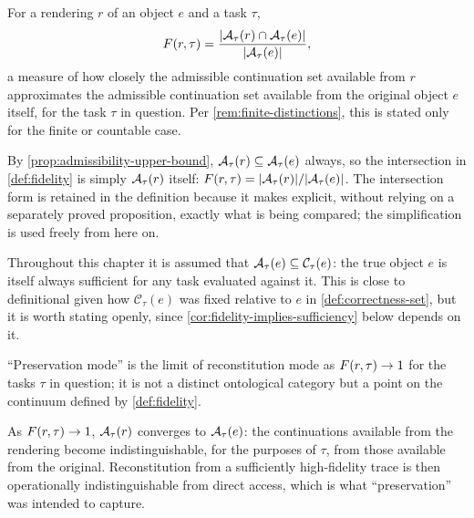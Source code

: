 \begin{definition}[Fidelity]
\label{def:fidelity}
For a rendering $r$ of an object $e$ and a task $\tau$,
\[
F(r,\tau) = \frac{\lvert \mathcal{A}_{\tau}(r) \cap \mathcal{A}_{\tau}(e)
\rvert}{\lvert \mathcal{A}_{\tau}(e) \rvert},
\]
a measure of how closely the admissible continuation set available from
$r$ approximates the admissible continuation set available from the
original object $e$ itself, for the task $\tau$ in question. Per
\cref{rem:finite-distinctions}, this is stated only for the finite or
countable case.
\end{definition}

\begin{remark}
\label{rem:fidelity-simplifies}
By \cref{prop:admissibility-upper-bound}, $\mathcal{A}_{\tau}(r) \subseteq
\mathcal{A}_{\tau}(e)$ always, so the intersection in \cref{def:fidelity} is
simply $\mathcal{A}_{\tau}(r)$ itself:
$F(r,\tau) = \lvert\mathcal{A}_{\tau}(r)\rvert / \lvert\mathcal{A}_{\tau}(e)\rvert$.
The intersection form is retained in the definition because it makes
explicit, without relying on a separately proved proposition, exactly
what is being compared; the simplification is used freely from here on.
\end{remark}

\begin{remark}
\label{rem:ground-truth-sufficiency}
Throughout this chapter it is assumed that $\mathcal{A}_{\tau}(e) \subseteq
\mathcal{C}_\tau(e)$: the true object $e$ is itself always sufficient for
any task evaluated against it. This is close to definitional given how
$\mathcal{C}_\tau(e)$ was fixed relative to $e$ in
\cref{def:correctness-set}, but it is worth stating openly, since
\cref{cor:fidelity-implies-sufficiency} below depends on it.
\end{remark}

\begin{proposition}
\label{prop:preservation-limit}
``Preservation mode'' is the limit of reconstitution mode as
$F(r,\tau) \to 1$ for the tasks $\tau$ in question; it is not a
distinct ontological category but a point on the continuum defined by
\cref{def:fidelity}.
\end{proposition}

\begin{proofsketch}
As $F(r,\tau) \to 1$, $\mathcal{A}_{\tau}(r)$ converges to
$\mathcal{A}_{\tau}(e)$: the continuations available from the rendering become
indistinguishable, for the purposes of $\tau$, from those available from
the original. Reconstitution from a sufficiently high-fidelity trace is
then operationally indistinguishable from direct access, which is what
``preservation'' was intended to capture.
\end{proofsketch}

